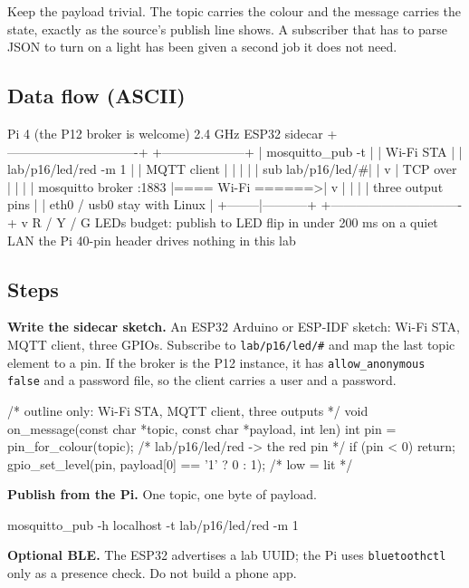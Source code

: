 Keep the payload trivial. The topic carries the colour and the message carries the state, exactly as the source's publish line shows. A subscriber that has to parse JSON to turn on a light has been given a second job it does not need.

\subsection*{Data flow (ASCII)}

\begin{asciiart}
  Pi 4  (the P12 broker is welcome)        2.4 GHz         ESP32 sidecar
  +-------------------------------+                    +--------------------+
  | mosquitto_pub -t              |                    | Wi-Fi STA          |
  |   lab/p16/led/red -m 1        |                    | MQTT client        |
  |        |                      |                    |   sub lab/p16/led/#|
  |        v                      |    TCP over        |        |           |
  | mosquitto broker :1883        |====  Wi-Fi  ======>|        v           |
  |                               |                    | three output pins  |
  | eth0 / usb0 stay with Linux   |                    +--------|-----------+
  +-------------------------------+                             v
                                                        R / Y / G LEDs
  budget: publish to LED flip in under 200 ms on a quiet LAN
  the Pi 40-pin header drives nothing in this lab
\end{asciiart}

\subsection*{Steps}

\begin{steps}
\item \textbf{Write the sidecar sketch.} An ESP32 Arduino or ESP-IDF sketch: Wi-Fi STA, MQTT client, three GPIOs. Subscribe to \texttt{lab/p16/led/\#} and map the last topic element to a pin. If the broker is the P12 instance, it has \texttt{allow\_anonymous false} and a password file, so the client carries a user and a password.
\begin{ccode}
/* outline only: Wi-Fi STA, MQTT client, three outputs */
void on_message(const char *topic, const char *payload, int len)
{
    int pin = pin_for_colour(topic);   /* lab/p16/led/red -> the red pin */
    if (pin < 0)
        return;
    gpio_set_level(pin, payload[0] == '1' ? 0 : 1);   /* low = lit */
}
\end{ccode}

\item \textbf{Publish from the Pi.} One topic, one byte of payload.
\begin{shellcode}
mosquitto_pub -h localhost -t lab/p16/led/red -m 1
\end{shellcode}

\item \textbf{Optional BLE.} The ESP32 advertises a lab UUID; the Pi uses \texttt{bluetoothctl} only as a presence check. Do not build a phone app.
\end{steps}

